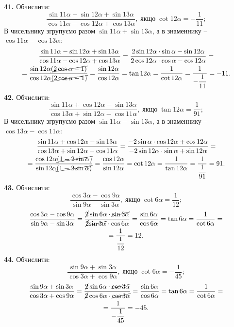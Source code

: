 \textbf{41.} Обчислити:
$$
\dfrac{\sin11\alpha-\sin12\alpha+\sin13\alpha}{\cos11\alpha-\cos12\alpha+\cos13\alpha}, \; \mbox{якщо} \; \cot12\alpha=-\dfrac{1}{11};
$$
В чисельнику згрупуємо разом $\sin11\alpha+\sin13\alpha$, а в знаменнику -- $\cos11\alpha-\cos13\alpha$:
\begin{multline*}
\dfrac{\sin11\alpha-\sin12\alpha+\sin13\alpha}{\cos11\alpha-\cos12\alpha+\cos13\alpha}=
\dfrac{2\sin12\alpha\cdot\sin\alpha-\sin12\alpha}{2\cos12\alpha\cdot\cos\alpha-\cos12\alpha}=\\
=\dfrac{\sin12\alpha\cancel{(2\cos\alpha-1)}}{\cos12\alpha\cancel{(2\cos\alpha-1)}}=
\dfrac{\sin12\alpha}{\cos12\alpha}=\tan12\alpha=\dfrac{1}{\cot12\alpha}=\dfrac{1}{-\dfrac{1}{11}}=-11.
\end{multline*}
\textbf{42.} Обчислити:
$$
\dfrac{\sin11\alpha+\cos12\alpha-\sin13\alpha}{\cos13\alpha+\sin12\alpha-\cos11\alpha}, \; \mbox{якщо} \; \tan12\alpha=\dfrac{1}{91};
$$
В чисельнику згрупуємо разом $\sin11\alpha-\sin13\alpha$, а в знаменнику -- $\cos13\alpha-\cos11\alpha$:
\begin{multline*}
\dfrac{\sin11\alpha+\cos12\alpha-\sin13\alpha}{\cos13\alpha+\sin12\alpha-\cos11\alpha}=
\dfrac{-2\sin\alpha\cdot\cos12\alpha+\cos12\alpha}{-2\sin12\alpha\cdot\sin\alpha+\sin12\alpha}=\\
=\dfrac{\cos12\alpha\cancel{(1-2\sin\alpha)}}{\sin12\alpha\cancel{(1-2\sin\alpha)}}=
\dfrac{\cos12\alpha}{\sin12\alpha}=\cot12\alpha=\dfrac{1}{\tan12\alpha}=\dfrac{1}{\dfrac{1}{91}}=91.
\end{multline*}
\textbf{43.} Обчислити:
$$
\dfrac{\cos3\alpha-\cos9\alpha}{\sin9\alpha-\sin3\alpha}, \; \mbox{якщо} \; \cot6\alpha=\dfrac{1}{12};
$$
\begin{multline*}
\dfrac{\cos3\alpha-\cos9\alpha}{\sin9\alpha-\sin3\alpha}=
\dfrac{\cancel{2}\sin6\alpha\cdot\cancel{\sin3\alpha}}{\cancel{2}\cancel{\sin3\alpha}\cdot\cos6\alpha}=
\dfrac{\sin6\alpha}{\cos6\alpha}=\tan6\alpha=\dfrac{1}{\cot6\alpha}=\\
=\dfrac{1}{\dfrac{1}{12}}=12.
\end{multline*}
\textbf{44.} Обчислити:
$$
\dfrac{\sin9\alpha+\sin3\alpha}{\cos3\alpha+\cos9\alpha}, \; \mbox{якщо} \; \cot6\alpha=-\dfrac{1}{45};
$$
\begin{multline*}
\dfrac{\sin9\alpha+\sin3\alpha}{\cos3\alpha+\cos9\alpha}=
\dfrac{\cancel{2}\sin6\alpha\cdot\cancel{\cos3\alpha}}{\cancel{2}\cos6\alpha\cdot\cancel{\cos3\alpha}}=
\dfrac{\sin6\alpha}{\cos6\alpha}=
\tan6\alpha=\dfrac{1}{\cot6\alpha}=\\
=\dfrac{1}{-\dfrac{1}{45}}=-45.
\end{multline*}

